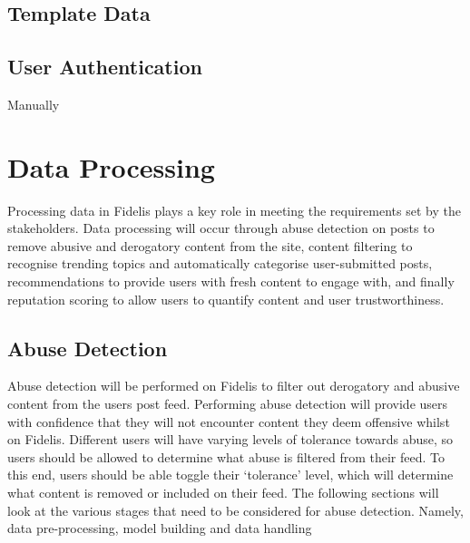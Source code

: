 \subsection{Template Data}


\subsection{User Authentication}
Manually

\section{Data Processing}
Processing data in Fidelis plays a key role in meeting the requirements set by the stakeholders. Data processing will occur through abuse detection on posts to remove abusive and derogatory content from the site, content filtering to recognise trending topics and automatically categorise user-submitted posts, recommendations to provide users with fresh content to engage with, and finally reputation scoring to allow users to quantify content and user trustworthiness.

\subsection{Abuse Detection}
Abuse detection will be performed on Fidelis to filter out derogatory and abusive content from the users post feed. Performing abuse detection will provide users with confidence that they will not encounter content they deem offensive whilst on Fidelis. Different users will have varying levels of tolerance towards abuse, so users should be allowed to determine what abuse is filtered from their feed. To this end, users should be able toggle their `tolerance' level, which will determine what content is removed or included on their feed. The following sections will look at the various stages that need to be considered for abuse detection. Namely, data pre-processing, model building and data handling

